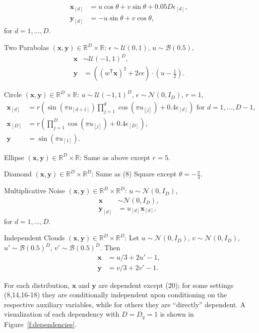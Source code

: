 \documentclass[11pt]{article}
\providecommand{\mb}[1]{\boldsymbol{#1}}
\providecommand{\mc}[1]{\mathcal{#1}}
\newcommand{\Real}{\mathbb{R}}
\newcommand{\T}{^{\ensuremath{\mathsf{T}}}}           %
\newcommand{\mby}{\ensuremath{\mb{y}}}
\begin{document}
\begin{compactenum}
\begin{align*}
\mb{x}_{[d]}&=u \cos\theta + v \sin\theta + 0.05 D\epsilon_{[d]},\\
\mb{y}_{[d]}&=-u \sin\theta + v \cos\theta,
\end{align*}
for $d=1,\ldots,D$.
\item Two Parabolas $(\mb{x},\mb{y}) \in \Real^{D} \times \Real$: $\epsilon \sim \mc{U}(0,1)$, $u \sim \mc{B}(0.5)$,
\begin{align*}
\mb{x} &\sim \mc{U}(-1,1)^{D},\\
\mb{y}&=\left( (w\T \mb{x})^2  + 2c\epsilon\right) \cdot (u-\tfrac{1}{2}).
\end{align*}
\item Circle $(\mb{x},\mb{y}) \in \Real^{D} \times \Real$: $u \sim \mc{U}(-1,1)^{D}$, $\epsilon \sim \mc{N}(0, I_{D})$, $r=1$,
\begin{align*}
\mb{x}_{[d]}&=r \left(\sin(\pi u_{[d+1]})  \prod_{j=1}^{d} \cos(\pi u_{[j]})+0.4 \epsilon_{[d]}\right) \mbox{ for $d=1,\ldots,D-1$},\\
\mb{x}_{[D]}&=r \left(\prod_{j=1}^{D} \cos(\pi u_{[j]})+0.4 \epsilon_{[D]}\right),\\
\mb{y}&= \sin(\pi u_{[1]}).
\end{align*}
\item Ellipse $(\mb{x},\mb{y}) \in \Real^{D} \times \Real$: Same as above except $r=5$.
\item Diamond $(\mb{x},\mb{y}) \in \Real^{D} \times \Real^{D}$: Same as (8) Square except $\theta=-\frac{\pi}{4}$.
\item Multiplicative Noise $(\mb{x},\mb{y}) \in \Real^{D} \times \Real^{D}$: $u \sim \mc{N}(0, I_{D})$, 
\begin{align*}
\mb{x} &\sim \mc{N}(0, I_{D}),\\
\mb{y}_{[d]}&=u_{[d]}\mb{x}_{[d]},
\end{align*}
for $d=1,\ldots,D$.
\item Independent Clouds $(\mb{x},\mb{y}) \in \Real^{D} \times \Real^{D}$: Let $u \sim \mc{N}(0,I_{D})$, $v \sim \mc{N}(0,I_{D})$, $u' \sim \mc{B}(0.5)^{D}$, $v' \sim \mc{B}(0.5)^{D}$. Then
\begin{align*}
\mb{x}&=u/3+2u'-1,\\
\mb{y}&=v/3+2v'-1.
\end{align*}
\end{compactenum}

For each distribution, $\mb{x}$ and $\mb{y}$ are dependent except  (20); for some settings (8,14,16-18) they are conditionally independent upon conditioning on the respective auxiliary variables, while for others they are
 ``directly'' dependent. 
A visualization of each dependency with $D=D_y=1$ is shown in Figure~\ref{f:dependencies}.
\end{document}
